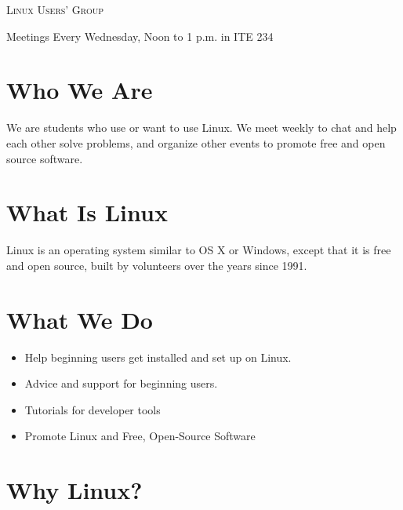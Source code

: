 \documentclass[11pt]{article}
\begin{document}
\begin{multicols*}{2}

\begin{center} \scshape \Huge
    \phantom{x}
    Linux Users' Group
\end{center}

\begin{center} \Large
    Meetings
    Every Wednesday, Noon to 1 p.m. in ITE 234
\end{center}

\section*{Who We Are}

We are students who use or want to use Linux. We meet weekly to chat and help
each other solve problems, and organize other events to promote free and open
source software.

\section*{What Is Linux}

Linux is an operating system similar to OS X or Windows, except that it is free
and open source, built by volunteers over the years since 1991.


\section*{What We Do}


\begin{itemize} \large
\item Help beginning users get installed and set up on Linux.
\item Advice and support for beginning users.
\item Tutorials for developer tools
\item Promote Linux and Free, Open-Source Software
\end{itemize}

\section*{Why Linux?}


\end{multicols*}
\end{document}

